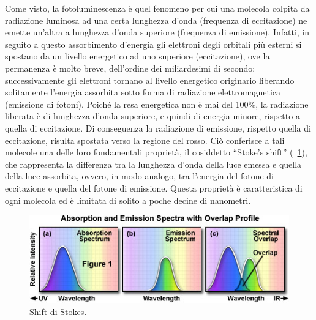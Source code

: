 Come visto, la fotoluminescenza è quel fenomeno per cui una molecola colpita da radiazione luminosa ad una certa lunghezza d'onda (frequenza di eccitazione) ne emette un'altra a lunghezza d'onda superiore (frequenza di emissione). 
Infatti, in seguito a questo assorbimento d'energia gli elettroni degli orbitali più esterni si spostano da un livello energetico ad uno superiore (eccitazione), ove la permanenza è molto breve, dell'ordine dei miliardesimi di secondo; successivamente gli elettroni tornano al livello energetico originario liberando solitamente l'energia assorbita sotto forma di radiazione elettromagnetica (emissione di fotoni). 
Poiché la resa energetica non è mai del 100\%, la radiazione liberata è di lunghezza d'onda superiore, e quindi di energia minore, rispetto a quella di eccitazione. 
Di conseguenza la radiazione di emissione, rispetto quella di eccitazione, risulta spostata verso la regione del rosso. 
Ciò conferisce a tali molecole una delle loro fondamentali proprietà, il cosiddetto ``Stoke's shift'' (\figurename~\ref{fig:stokes}), che rappresenta la differenza tra la lunghezza d'onda della luce emessa e quella della luce assorbita, ovvero, in modo analogo, tra l'energia del fotone di eccitazione e quella del fotone di emissione.
Questa proprietà è caratteristica di ogni molecola ed è limitata di solito a poche decine di nanometri.

\begin{figure}
 \centering
\includegraphics[scale=0.80]{img/CAP1stokes.jpg}
 \caption{ \small{Shift di Stokes.} }
 \label{fig:stokes}
\end{figure}

